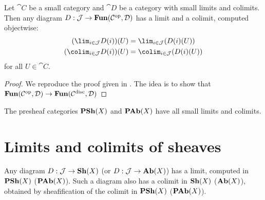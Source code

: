 \documentclass[../main.tex]{subfiles}
\begin{document}
\begin{lem}
	Let $\cat C$ be a small category and $\cat D$ be a category with small limits and colimits.
	Then any diagram $D: \mathcal{J} \to \operatorname{\mathbf{Fun}}(\mathcal{C}^{\mathrm{op}}, \mathcal{D})$ has a limit and a colimit, computed objectwise:
	\begin{align*}
    	(\lim_{i\in \cat J}D(i))(U) &= \lim_{i \in \cat J}(D(i)(U))\\
    	(\colim_{i\in \cat J}D(i))(U) &= \colim_{i \in \cat J}(D(i)(U))
    \end{align*} for all $U \in \cat C$.

\end{lem}
\begin{proof}
	We reproduce the proof given in \cite{riehlCategoryTheoryContext2016}. The idea is to show that $\operatorname{\mathbf{Fun}}(\mathcal{C}^{\mathrm{op}}, \mathcal{D}) \to \operatorname{\mathbf{Fun}}(\mathcal{C}^\text{disc}, \mathcal{D})$ 
\end{proof}

\begin{cor}
	The presheaf categories $\operatorname{\mathbf{PSh}}(X)$ and $\operatorname{\mathbf{PAb}}(X)$ have all small limits and colimits.
\end{cor}

\section{Limits and colimits of sheaves}

\begin{thm}\label{thm:limits-colimits-sheaves}
	Any diagram $D: \mathcal{J} \to \operatorname{\mathbf{Sh}}(X)$ (or $D: \mathcal{J} \to \operatorname{\mathbf{Ab}}(X)$) has a limit, computed in $\operatorname{\mathbf{PSh}}(X)$ ($\operatorname{\mathbf{PAb}}(X)$).
	Such a diagram also has a colimit in $\operatorname{\mathbf{Sh}}(X)$ ($\operatorname{\mathbf{Ab}}(X)$), obtained by sheafification of the colimit in $\operatorname{\mathbf{PSh}}(X)$ ($\operatorname{\mathbf{PAb}}(X)$).
\end{thm}
\end{document}
